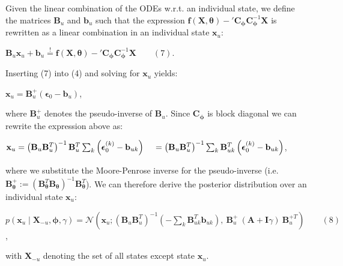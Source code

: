 \begin{par}
Given the linear combination of the ODEs w.r.t. an individual state, we define the matrices $\mathbf{B}_u$ and $\mathbf{b}_u$ such that the expression $\mathbf{f}(\mathbf{X},\boldsymbol{\theta}) - {'\mathbf{C}}_{\boldsymbol{\phi}}\mathbf{C}_{\boldsymbol{\phi}}^{-1} \mathbf{X}$ is rewritten as a linear combination in an individual state $\mathbf{x}_u$:
\end{par} \vspace{1em}
\begin{par}
$\mathbf{B}_{u} \mathbf{x}_u + \mathbf{b}_{u} \stackrel{!}{=}\mathbf{f}(\mathbf{X},\boldsymbol{\theta}) - {'\mathbf{C}}_{\boldsymbol{\phi}}\mathbf{C}_{\boldsymbol{\phi}}^{-1} \mathbf{X} \qquad (7)$.
\end{par} \vspace{1em}
\begin{par}
Inserting (7) into (4) and solving for $\mathbf{x}_u$ yields:
\end{par} \vspace{1em}
\begin{par}
$\mathbf{x}_u = \mathbf{B}_{u}^+ \left( \boldsymbol{\epsilon}_0 -\mathbf{b}_{u}\right)$,
\end{par} \vspace{1em}
\begin{par}
where $\mathbf{B}_{u}^+$ denotes the pseudo-inverse of $\mathbf{B}_{u}$. Since $\mathbf{C}_{\boldsymbol{\phi}}$ is block diagonal we can rewrite the expression above as:
\end{par} \vspace{1em}
\begin{par}
$\mathbf{x}_u = \left( \mathbf{B}_{u} \mathbf{B}_{u}^T \right)^{-1}\mathbf{B}_{u}^T \sum_k \left(\boldsymbol{\epsilon}_0^{(k)} -\mathbf{b}_{uk} \right)\\ \quad= \left( \mathbf{B}_{u} \mathbf{B}_{u}^T \right)^{-1} \sum_k\mathbf{B}_{uk}^T \left(\boldsymbol{\epsilon}_0^{(k)} -\mathbf{b}_{uk} \right)$,
\end{par} \vspace{1em}
\begin{par}
where we substitute the Moore-Penrose inverse for the pseudo-inverse (i.e. $\mathbf{B}_{\boldsymbol{\theta}}^+ := \left( \mathbf{B}_{\boldsymbol{\theta}}^T \mathbf{B}_{\boldsymbol{\theta}}\right)^{-1} \mathbf{B}_{\boldsymbol{\theta}}^T$).  We can therefore derive the posterior distribution over an individual state $\mathbf{x}_{u}$:
\end{par} \vspace{1em}
\begin{par}
$p(\mathbf{x}_u \mid \mathbf{X}_{-u}, \boldsymbol{\phi}, \gamma)= \mathcal{N}\left(\mathbf{x}_u ; \left( \mathbf{B}_{u} \mathbf{B}_{u}^T\right)^{-1} \left( - \sum_k \mathbf{B}_{uk}^T \mathbf{b}_{uk} \right),~\mathbf{B}_{u}^{+} ~ (\mathbf{A} + \mathbf{I}\gamma) ~ \mathbf{B}_u^{+T}\right) \qquad (8)$,
\end{par} \vspace{1em}
\begin{par}
with $\mathbf{X}_{-u}$ denoting the set of all states except state $\mathbf{x}_u$.
\end{par} \vspace{1em}


